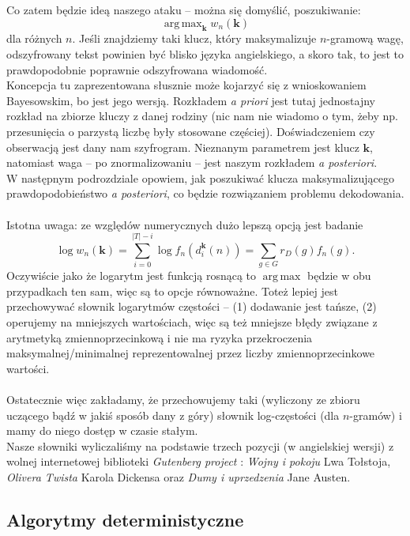 \documentclass[a4paper]{article}
\DeclareMathOperator*{\argmax}{arg\,max}
\theoremstyle{defn}
\theoremstyle{theorem}
\theoremstyle{lemma}
\theoremstyle{cor}
\theoremstyle{fact}
\begin{document}
Co zatem będzie ideą naszego ataku – można się domyślić, poszukiwanie:
$$ \argmax_{\boldsymbol{k}} w_n(\boldsymbol{k}) $$
dla różnych $n$. Jeśli znajdziemy taki klucz, który maksymalizuje $n$-gramową wagę, odszyfrowany tekst powinien być blisko języka angielskiego, a skoro tak, to jest to prawdopodobnie poprawnie odszyfrowana wiadomość.\\
Koncepcja tu zaprezentowana słusznie może kojarzyć się z wnioskowaniem Bayesowskim, bo jest jego wersją. Rozkładem \textit{a priori} jest tutaj jednostajny rozkład na zbiorze kluczy z danej rodziny (nic nam nie wiadomo o tym, żeby np. przesunięcia o parzystą liczbę były stosowane częściej). Doświadczeniem czy obserwacją jest dany nam szyfrogram. Nieznanym parametrem jest klucz $\boldsymbol{k}$, natomiast waga – po znormalizowaniu – jest naszym rozkładem \textit{a posteriori}.\\
W następnym podrozdziale opowiem, jak poszukiwać klucza maksymalizującego prawdopodobieństwo \textit{a posteriori}, co będzie rozwiązaniem problemu dekodowania.\\\\
Istotna uwaga: ze względów numerycznych dużo lepszą opcją jest badanie $$\log w_n(\boldsymbol{k}) = \sum\limits_{i=0}^{|T|-i} \log f_n(d_i^{\boldsymbol{k}}(n)) = \sum\limits_{g \in G}{r_D(g)} f_n(g).$$
Oczywiście jako że logarytm jest funkcją rosnącą to $\argmax$ będzie w obu przypadkach ten sam, więc są to opcje równoważne. Toteż lepiej jest przechowywać słownik logarytmów częstości – (1) dodawanie jest tańsze, (2) operujemy na mniejszych wartościach, więc są też mniejsze błędy związane z arytmetyką zmiennoprzecinkową i nie ma ryzyka przekroczenia maksymalnej/minimalnej reprezentowalnej przez liczby zmiennoprzecinkowe wartości.\\\\
Ostatecznie więc zakładamy, że przechowujemy taki (wyliczony ze zbioru uczącego bądź w jakiś sposób dany z góry) słownik log-częstości (dla $n$-gramów) i mamy do niego dostęp w czasie stałym.
\\
Nasze słowniki wyliczaliśmy na podstawie trzech pozycji (w angielskiej wersji) z wolnej internetowej biblioteki \textit{Gutenberg project} \cite{gutenberg}: \textit{Wojny i pokoju} Lwa Tołstoja, \textit{Olivera Twista} Karola Dickensa oraz \textit{Dumy i uprzedzenia} Jane Austen.
\subsection{Algorytmy deterministyczne}
\label{sect4.4}
\end{document}
